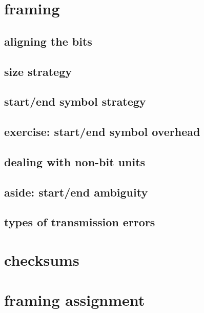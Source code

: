 
\section{framing}

\subsection{aligning the bits}



\subsection{size strategy}



\subsection{start/end symbol strategy}



\subsection{exercise: start/end symbol overhead}



\subsection{dealing with non-bit units}


\subsection{aside: start/end ambiguity}


\subsection{types of transmission errors}



\section{checksums}


\section{framing assignment}

